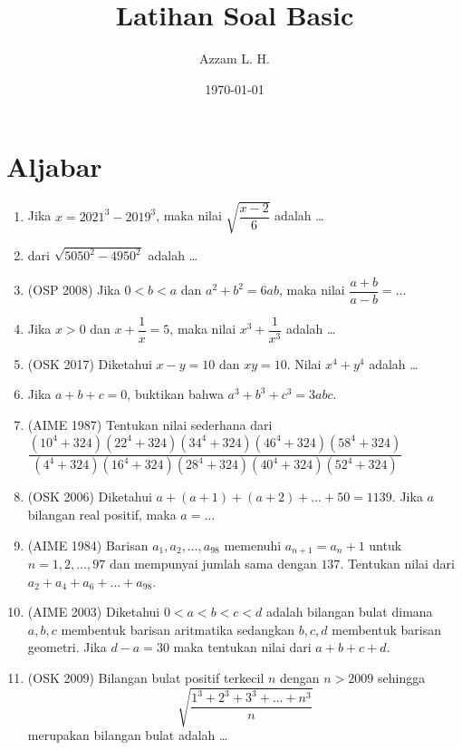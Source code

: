 \documentclass[11pt]{scrartcl}
\begin{document}
	\title{Latihan Soal Basic} %
	\date{\today}
	\author{Azzam L. H.}
	\maketitle
    
    \section{Aljabar}
    \begin{enumerate}
    \item Jika $x=2021^3-2019^3$, maka nilai $\sqrt{\dfrac{x-2}{6}}$ adalah \dots
    \item  dari $\sqrt{5050^2-4950^2}$ adalah \dots

    \item (OSP 2008) Jika $0 < b < a$ dan $a^2+b^2=6ab$, maka nilai $\dfrac{a+b}{a-b}=\dots$
    
    \item Jika $x > 0$ dan $x + \dfrac{1}{x} =  5$, maka nilai $x^3+\dfrac{1}{x^3}$ adalah \dots
    
    \item (OSK 2017) Diketahui $x-y=10$ dan $xy=10$. Nilai $x^4+y^4$ adalah \dots
    
    \item Jika $a+b+c=0$, buktikan bahwa $a^3+b^3+c^3=3abc$.

    \item (AIME 1987)
    Tentukan nilai sederhana dari $\dfrac{(10^4+324)(22^4+324)(34^4+324)(46^4+324)(58^4+324)}{(4^4+324)(16^4+324)(28^4+324)(40^4+324)(52^4+324)}$
    
    \item (OSK 2006) Diketahui $a+(a+1)+(a+2)+\dots+50=1139$. Jika $a$ bilangan real positif, maka $a=\dots$
    
    \item (AIME 1984) Barisan $a_1,a_2,\dots,a_{98}$ memenuhi $a_{n+1}=a_n+1$ untuk $n=1,2,\dots,97$ dan mempunyai jumlah sama dengan $137$. Tentukan nilai dari $a_2+a_4+a_6+\dots+a_{98}$.
    
    \item (AIME 2003) Diketahui $0<a<b<c<d$ adalah bilangan bulat dimana $a,b,c$ membentuk barisan aritmatika sedangkan $b,c,d$ membentuk barisan geometri. Jika $d-a=30$ maka tentukan nilai dari $a+b+c+d$.
    
    \item (OSK 2009) Bilangan bulat positif terkecil $n$ dengan $n> 2009$ sehingga $$\sqrt{\dfrac{1^3+2^3+3^3+\dots+n^3}{n}}$$
    merupakan bilangan bulat adalah \dots
    

\end{enumerate}
\end{document}
